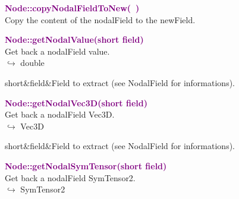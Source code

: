 \textcolor{purple}{\textbf{Node::copyNodalFieldToNew(~)}}\label{Node::copyNodalFieldToNew()}\\
Copy the content of the nodalField to the newField.


\textcolor{purple}{\textbf{Node::getNodalValue(short field)}}\label{Node::getNodalValue(short field)}\\
Get back a nodalField value.\\ \hspace*{10mm}$\hookrightarrow$ double

\begin{tcolorbox}[width=\textwidth,myArgs,tabularx={ll|R},title=Arguments of Node::getNodalValue]
short&field&Field to extract (see NodalField for informations).
\end{tcolorbox}


\textcolor{purple}{\textbf{Node::getNodalVec3D(short field)}}\label{Node::getNodalVec3D(short field)}\\
Get back a nodalField Vec3D.\\ \hspace*{10mm}$\hookrightarrow$ Vec3D

\begin{tcolorbox}[width=\textwidth,myArgs,tabularx={ll|R},title=Arguments of Node::getNodalVec3D]
short&field&Field to extract (see NodalField for informations).
\end{tcolorbox}



\textcolor{purple}{\textbf{Node::getNodalSymTensor(short field)}}\label{Node::getNodalSymTensor(short field)}\\
Get back a nodalField SymTensor2.\\ \hspace*{10mm}$\hookrightarrow$ SymTensor2


